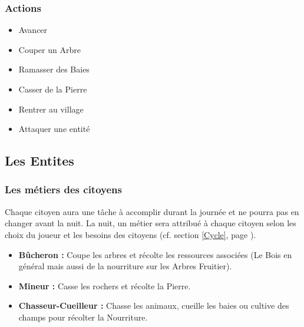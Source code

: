\documentclass[a4paper]{article}
\newcommand{\alinea}{\hspace*{0.5cm}}
\begin{document}
		  
        \subsubsection{Actions}
          \begin{itemize} \small
            \item Avancer
            \item Couper un Arbre
            \item Ramasser des Baies
            \item Casser de la Pierre
            \item Rentrer au village
            \item Attaquer une entité
          \end{itemize} \normalsize


		\subsection{Les Entites}
			\subsubsection{Les métiers des citoyens}
			\label{Metier}
			\alinea Chaque citoyen aura une tâche à accomplir durant la journée et ne pourra pas en changer avant la nuit. La nuit, un métier sera attribué à chaque citoyen selon les choix du joueur et les besoins des citoyens (cf. section \ref{Cycle}, page \pageref{Cycle}).
			\begin{itemize} \small
			  \item \textbf{Bûcheron :} Coupe les arbres et récolte les ressources associées (Le Bois en général mais aussi de la nourriture sur les Arbres Fruitier).
			  \item \textbf{Mineur :} Casse les rochers et récolte la Pierre.
			  \item \textbf{Chasseur-Cueilleur :} Chasse les animaux, cueille les baies ou cultive des champs pour récolter la Nourriture.
			\end{itemize} \normalsize
\end{document}
